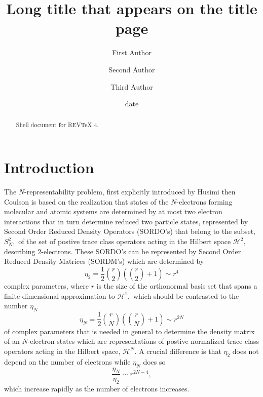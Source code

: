 \documentclass[aps,preprint]{revtex4}%
\begin{document}
\title[Short title for running header]{Long title that appears on the title page}
\author{First Author}
\author{Second Author}
\author{Third Author}

\begin{abstract}
Shell document for REV\TeX{} 4.

\end{abstract}
\date[Date text]{date}




\maketitle
\tableofcontents


\section{Introduction}

The $N$-representability problem, first explicitly introduced by Husimi
\cite{Husimi} then Coulson \cite{Coulson} is based on the realization that
states of the $N$-electrons forming molecular and atomic systems are
determined by at most two electron interactions that in turn determine reduced
two particle states, represented by Second Order Reduced Density Operators
(SORDO's) that belong to the subset, $S_{N}^{2},$ of the set of postive trace
class operators acting in the Hilbert space $\mathcal{H}^{2},$ describing
$2$-electrons. These SORDO's can be represented by Second Order Reduced
Density Matrices (SORDM's) which are determined by
\begin{equation}
\eta_{2}=\frac{1}{2}\binom{r}{2}\left(  \binom{r}{2}+1\right)  \sim r^{4}%
\end{equation}
complex parameters, where $r$ is the size of the orthonormal basis set that
spans a finite dimensional approximation to $\mathcal{H}^{1},$ which should be
contrasted to the number $\eta_{N}$
\begin{equation}
\eta_{N}=\frac{1}{2}\binom{r}{N}\left(  \binom{r}{N}+1\right)  \sim r^{2N}%
\end{equation}
of complex parameters that is needed in general to determine the density
matrix of an $N$-electron states which are representations of postive
normalized trace class operators acting in the Hilbert space, $\mathcal{H}%
^{N}$. A crucial difference is that $\eta_{2}$ does not depend on the number
of electrons while $\eta_{N}$ does so
\begin{equation}
\frac{\eta_{N}}{\eta_{2}}\sim r^{2N-4},
\end{equation}
which increase rapidly as the number of electrons increases.
\end{document}
